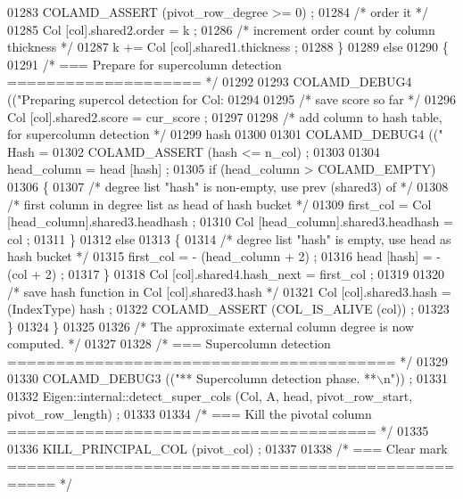 \begin{DoxyCode}
{{{{{{{{{{{{{{{{{{{{{{{{{{01283     COLAMD\_ASSERT (pivot\_row\_degree >= 0) ;
01284     \textcolor{comment}{/* order it */}
01285     Col [col].shared2.order = k ;
01286     \textcolor{comment}{/* increment order count by column thickness */}
01287     k += Col [col].shared1.thickness ;
01288       \}
01289       \textcolor{keywordflow}{else}
01290       \{
01291     \textcolor{comment}{/* === Prepare for supercolumn detection ==================== */}
01292 
01293     COLAMD\_DEBUG4 ((\textcolor{stringliteral}{"Preparing supercol detection for Col: %
01294 
01295     \textcolor{comment}{/* save score so far */}
01296     Col [col].shared2.score = cur\_score ;
01297 
01298     \textcolor{comment}{/* add column to hash table, for supercolumn detection */}
01299     hash %
01300 
01301     COLAMD\_DEBUG4 ((\textcolor{stringliteral}{" Hash = %
01302     COLAMD\_ASSERT (hash <= n\_col) ;
01303 
01304     head\_column = head [hash] ;
01305     \textcolor{keywordflow}{if} (head\_column > COLAMD\_EMPTY)
01306     \{
01307       \textcolor{comment}{/* degree list "hash" is non-empty, use prev (shared3) of */}
01308       \textcolor{comment}{/* first column in degree list as head of hash bucket */}
01309       first\_col = Col [head\_column].shared3.headhash ;
01310       Col [head\_column].shared3.headhash = col ;
01311     \}
01312     \textcolor{keywordflow}{else}
01313     \{
01314       \textcolor{comment}{/* degree list "hash" is empty, use head as hash bucket */}
01315       first\_col = - (head\_column + 2) ;
01316       head [hash] = - (col + 2) ;
01317     \}
01318     Col [col].shared4.hash\_next = first\_col ;
01319 
01320     \textcolor{comment}{/* save hash function in Col [col].shared3.hash */}
01321     Col [col].shared3.hash = (IndexType) hash ;
01322     COLAMD\_ASSERT (COL\_IS\_ALIVE (col)) ;
01323       \}
01324     \}
01325 
01326     \textcolor{comment}{/* The approximate external column degree is now computed.  */}
01327 
01328     \textcolor{comment}{/* === Supercolumn detection ======================================== */}
01329 
01330     COLAMD\_DEBUG3 ((\textcolor{stringliteral}{"** Supercolumn detection phase. **\(\backslash\)n"})) ;
01331 
01332     Eigen::internal::detect\_super\_cols (Col, A, head, pivot\_row\_start, pivot\_row\_length) ;
01333 
01334     \textcolor{comment}{/* === Kill the pivotal column ====================================== */}
01335 
01336     KILL\_PRINCIPAL\_COL (pivot\_col) ;
01337 
01338     \textcolor{comment}{/* === Clear mark =================================================== */}
}}}}}}}}}}}}}}}}}}}}}}}}}}}}
\end{DoxyCode}
